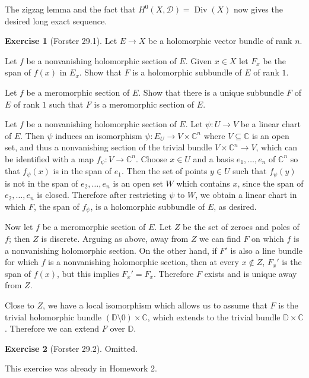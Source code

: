 \documentclass[10pt]{article}
\newcommand{\CC}{\mathbb{C}}
\newcommand{\DD}{\mathbb D}
\newcommand{\Div}{\operatorname{Div}}
\theoremstyle{definition}
\newtheorem{exer}{Exercise}
\begin{document}
The zigzag lemma and the fact that $H^0(X, \mathscr D) = \Div(X)$ now gives the desired long exact sequence.

\begin{exer}[Forster 29.1]
Let $E \to X$ be a holomorphic vector bundle of rank $n$.

Let $f$ be a nonvanishing holomorphic section of $E$. Given $x \in X$ let $F_x$ be the span of $f(x)$ in $E_x$.
Show that $F$ is a holomorphic subbundle of $E$ of rank $1$.

Let $f$ be a meromorphic section of $E$. Show that there is a unique subbundle $F$ of $E$ of rank $1$ such that $F$ is a meromorphic section of $E$.
\end{exer}

Let $f$ be a nonvanishing holomorphic section of $E$.
Let $\psi: U \to V$ be a linear chart of $E$.
Then $\psi$ induces an isomorphism $\psi: E_U \to V \times \CC^n$ where $V \subseteq \CC$ is an open set, and thus a nonvanishing section of the trivial bundle $V \times \CC^n \to V$, which can be identified with a map $f_\psi: V \to \CC^n$.
Choose $x \in U$ and a basis $e_1, \dots, e_n$ of $\CC^n$ so that $f_\psi(x)$ is in the span of $e_1$.
Then the set of points $y \in U$ such that $f_\psi(y)$ is not in the span of $e_2, \dots, e_n$ is an open set $W$ which contains $x$, since the span of $e_2, \dots, e_n$ is closed.
Therefore after restricting $\psi$ to $W$, we obtain a linear chart in which $F$, the span of $f_\psi$, is a holomorphic subbundle of $E$, as desired.

Now let $f$ be a meromorphic section of $E$.
Let $Z$ be the set of zeroes and poles of $f$; then $Z$ is discrete.
Arguing as above, away from $Z$ we can find $F$ on which $f$ is a nonvanishing holomorphic section.
On the other hand, if $F'$ is also a line bundle for which $f$ is a nonvanishing holomorphic section, then at every $x \notin Z$, $F_x'$ is the span of $f(x)$, but this implies $F_x' = F_x$.
Therefore $F$ exists and is unique away from $Z$.

Close to $Z$, we have a local isomorphism which allows us to assume that $F$ is the trivial holomorphic bundle $(\DD \setminus 0) \times \CC$, which extends to the trivial bundle $\DD \times \CC$.
Therefore we can extend $F$ over $\DD$.

\begin{exer}[Forster 29.2]
Omitted.
\end{exer}

This exercise was already in Homework 2.
\end{document}
